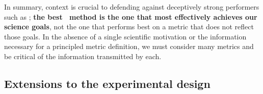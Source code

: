 In summary, context is crucial to defending against deceptively strong performers such as \trainz; \textbf{the best \pzpdf\ method is the one that most effectively achieves our science goals}, not the one that performs best on a metric that does not reflect those goals.
In the absence of a single scientific motivation or the information necessary for a principled metric definition, we must consider many metrics and be critical of the information transmitted by each.

\subsection{Extensions to the experimental design}

